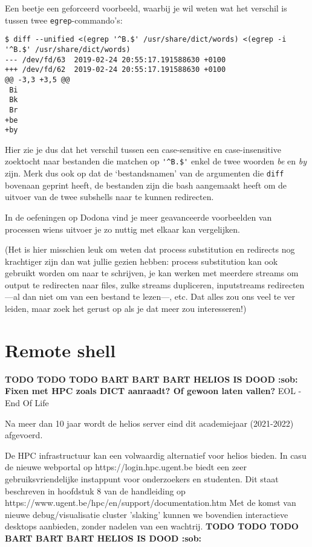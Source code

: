 \documentclass[a4paper,twoside,openany]{memoir}
\begin{document}
Een beetje een geforceerd voorbeeld, waarbij je wil weten wat het verschil is
tussen twee \verb!egrep!-commando's:

\begin{verbatim}
$ diff --unified <(egrep '^B.$' /usr/share/dict/words) <(egrep -i '^B.$' /usr/share/dict/words)
--- /dev/fd/63  2019-02-24 20:55:17.191588630 +0100
+++ /dev/fd/62  2019-02-24 20:55:17.191588630 +0100
@@ -3,3 +3,5 @@
 Bi
 Bk
 Br
+be
+by
\end{verbatim}

Hier zie je dus dat het verschil tussen een case-sensitive en case-insensitive
zoektocht naar bestanden die matchen op \verb!'^B.$'! enkel de twee woorden
\emph{be} en \emph{by} zijn. Merk dus ook op dat de `bestandsnamen' van de
argumenten die \verb!diff! bovenaan geprint heeft, de bestanden zijn die bash
aangemaakt heeft om de uitvoer van de twee subshells naar te kunnen redirecten.

In de oefeningen op Dodona vind je meer geavanceerde voorbeelden van processen
wiens uitvoer je zo nuttig met elkaar kan vergelijken.

(Het is hier misschien leuk om weten dat process substitution en redirects nog
krachtiger zijn dan wat jullie gezien hebben: process substitution kan ook
gebruikt worden om naar te schrijven, je kan werken met meerdere streams om
output te redirecten naar files, zulke streams dupliceren, inputstreams
redirecten---al dan niet om van een bestand te lezen---, etc. Dat alles zou ons
veel te ver leiden, maar zoek het gerust op als je dat meer zou interesseren!)

\chapter{Remote shell}

\textbf{TODO TODO TODO BART BART BART HELIOS IS DOOD :sob: Fixen met HPC zoals DICT aanraadt? Of gewoon laten vallen?}
EOL - End Of Life

Na meer dan 10 jaar wordt de helios server eind dit academiejaar (2021-2022) afgevoerd.

De HPC infrastructuur kan een volwaardig alternatief voor helios bieden. In casu de nieuwe webportal op https://login.hpc.ugent.be biedt een zeer gebruiksvriendelijke instappunt voor onderzoekers en studenten. Dit staat beschreven in hoofdstuk 8 van de handleiding op https://www.ugent.be/hpc/en/support/documentation.htm Met de komst van nieuwe debug/visualisatie cluster 'slaking' kunnen we bovendien interactieve desktops aanbieden, zonder nadelen van een wachtrij. 
\textbf{TODO TODO TODO BART BART BART HELIOS IS DOOD :sob:}
\end{document}
